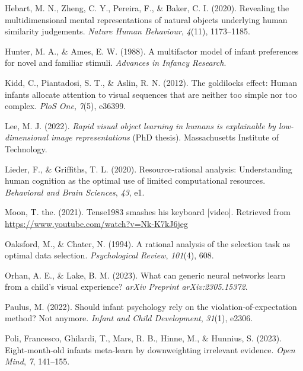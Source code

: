 \documentclass[10pt, letterpaper]{article}
\newenvironment{CSLReferences}%
  {}%
  {\par}
\begin{document}
\begin{CSLReferences}
\leavevmode{}%
Hebart, M. N., Zheng, C. Y., Pereira, F., \& Baker, C. I. (2020).
Revealing the multidimensional mental representations of natural objects
underlying human similarity judgements. \emph{Nature Human Behaviour},
\emph{4}(11), 1173--1185.

\leavevmode{}%
Hunter, M. A., \& Ames, E. W. (1988). A multifactor model of infant
preferences for novel and familiar stimuli. \emph{Advances in Infancy
Research}.

\leavevmode{}%
Kidd, C., Piantadosi, S. T., \& Aslin, R. N. (2012). The goldilocks
effect: Human infants allocate attention to visual sequences that are
neither too simple nor too complex. \emph{PloS One}, \emph{7}(5),
e36399.

\leavevmode{}%
Lee, M. J. (2022). \emph{Rapid visual object learning in humans is
explainable by low-dimensional image representations} (PhD thesis).
Massachusetts Institute of Technology.

\leavevmode{}%
Lieder, F., \& Griffiths, T. L. (2020). Resource-rational analysis:
Understanding human cognition as the optimal use of limited
computational resources. \emph{Behavioral and Brain Sciences},
\emph{43}, e1.

\leavevmode{}%
Moon, T. the. (2021). Tense1983 smashes his keyboard {[}video{]}.
Retrieved from \url{https://www.youtube.com/watch?v=Nk-K7kJ6jeg}

\leavevmode{}%
Oaksford, M., \& Chater, N. (1994). A rational analysis of the selection
task as optimal data selection. \emph{Psychological Review},
\emph{101}(4), 608.

\leavevmode{}%
Orhan, A. E., \& Lake, B. M. (2023). What can generic neural networks
learn from a child's visual experience? \emph{arXiv Preprint
arXiv:2305.15372}.

\leavevmode{}%
Paulus, M. (2022). Should infant psychology rely on the
violation-of-expectation method? Not anymore. \emph{Infant and Child
Development}, \emph{31}(1), e2306.

\leavevmode{}%
Poli, Francesco, Ghilardi, T., Mars, R. B., Hinne, M., \& Hunnius, S.
(2023). Eight-month-old infants meta-learn by downweighting irrelevant
evidence. \emph{Open Mind}, \emph{7}, 141--155.


\end{CSLReferences}
\end{document}
